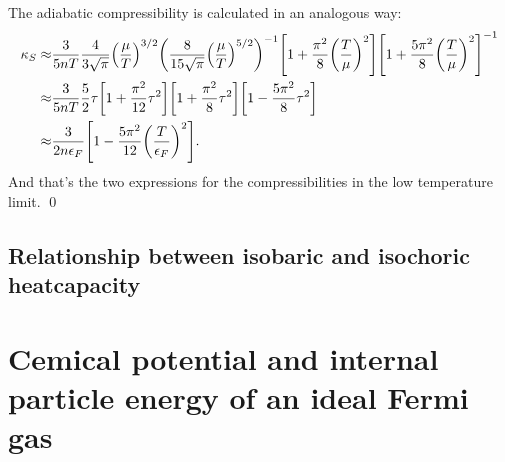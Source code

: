 \documentclass[11pt,letter, swedish, english
]{article}
\renewcommand{\thesubsection}{\arabic{section} (\alph{subsection})}
\begin{document}
The adiabatic compressibility is calculated in an analogous way:
\begin{equation}
\begin{aligned}
\kappa_S\approx& \frac{3}{5nT} 
\frac{4}{3\sqrt{\pi}}\qty(\frac{\mu}{T})^{3/2}
\qty(\frac{8}{15\sqrt{\pi}}\qty(\frac{\mu}{T})^{5/2})^{-1}
\qty[
1+\frac{\pi^2}{8}\qty(\frac{T}{\mu})^2]
\qty[
1+\frac{5\pi^2}{8}\qty(\frac{T}{\mu})^2]^{-1}\\
\approx&
 \frac{3}{5nT}\frac{5}{2}\tau\qty[1 +\frac{\pi^2}{12}\tau^2]
\qty[1+\frac{\pi^2}{8}\tau^2]
\qty[1-\frac{5\pi^2}{8}\tau^2]\\
\approx&\frac{3}{2n\epsilon_F}
\qty[1 - \frac{5\pi^2}{12}\qty(\frac{T}{\epsilon_F})^2].
\end{aligned}
\end{equation}
And that's the two expressions for the compressibilities in the low
temperature limit.
\qed

\subsection{Relationship between isobaric and isochoric heatcapacity}




\section{Cemical potential and internal particle energy of an ideal Fermi gas}
\renewcommand{\thesubsection}{\arabic{section} (\roman{subsection})}
\end{document}
